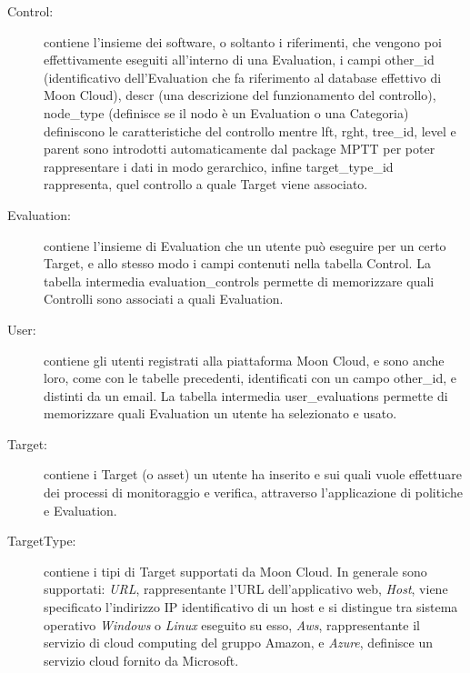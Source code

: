 \begin{description}
    \item[Control:] contiene l'insieme dei software, o soltanto i riferimenti, che vengono poi effettivamente eseguiti all'interno 
    di una Evaluation, i campi other\_id (identificativo dell'Evaluation che fa riferimento al database effettivo di Moon Cloud), 
    descr (una descrizione del funzionamento del controllo), node\_type (definisce se il nodo è un Evaluation o una Categoria) 
    definiscono le caratteristiche del controllo mentre lft, rght, tree\_id, level e parent sono introdotti 
    automaticamente dal package MPTT per poter rappresentare i dati in modo gerarchico, infine target\_type\_id rappresenta, quel 
    controllo a quale Target viene associato.
    \item[Evaluation:] contiene l'insieme di Evaluation che un utente può eseguire per un certo Target, e allo stesso modo 
    i campi contenuti nella tabella Control. La tabella intermedia evaluation\_controls permette di memorizzare quali Controlli 
    sono associati a quali Evaluation.
    \item[User:] contiene gli utenti registrati alla piattaforma Moon Cloud, e sono anche loro, come con le tabelle precedenti, 
    identificati con un campo other\_id, e distinti da un email. La tabella intermedia user\_evaluations permette di memorizzare 
    quali Evaluation un utente ha selezionato e usato.
    \item[Target:] contiene i  Target (o asset) un utente ha inserito e sui quali vuole effettuare dei processi 
    di monitoraggio e verifica, attraverso l'applicazione di politiche e Evaluation.
    \item[TargetType:] contiene i tipi di Target supportati da Moon Cloud. In generale sono supportati: \textit{URL}, 
    rappresentante l'URL dell'applicativo web, \textit{Host}, viene specificato l'indirizzo IP identificativo di un host e si distingue 
    tra sistema operativo \textit{Windows} o \textit{Linux} eseguito su esso, \textit{Aws}, rappresentante il servizio di cloud computing del 
    gruppo Amazon, e \textit{Azure}, definisce un servizio cloud fornito da Microsoft.
\end{description}
%
